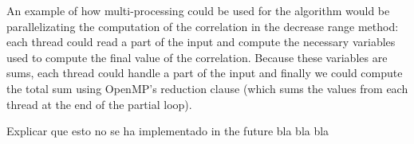 An example of how multi-processing could be used for the algorithm would be parallelizating the computation of the correlation in the decrease range method: each thread could read a part of the input and compute the necessary variables used to compute the final value of the correlation. Because these variables are sums, each thread could handle a part of the input and finally we could compute the total sum using OpenMP's reduction clause (which sums the values from each thread at the end of the partial loop).

Explicar que esto no se ha implementado in the future bla bla bla